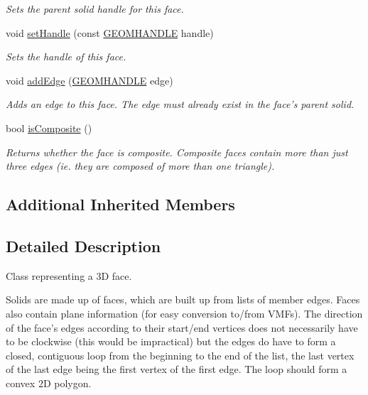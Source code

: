\begin{DoxyCompactItemize}
\begin{DoxyCompactList}\small\item\em Sets the parent solid handle for this face. \end{DoxyCompactList}\item 
void \hyperlink{class_face3_d_a3f040832e7d61cddc9286acce1597bfd}{set\-Handle} (const \hyperlink{vertex_8h_a72202e57358ed73cd212e9a2eaf39aeb}{G\-E\-O\-M\-H\-A\-N\-D\-L\-E} handle)
\begin{DoxyCompactList}\small\item\em Sets the handle of this face. \end{DoxyCompactList}\item 
void \hyperlink{class_face3_d_a67c54bddb563a26bdde53b59ba38ae86}{add\-Edge} (\hyperlink{vertex_8h_a72202e57358ed73cd212e9a2eaf39aeb}{G\-E\-O\-M\-H\-A\-N\-D\-L\-E} edge)
\begin{DoxyCompactList}\small\item\em Adds an edge to this face. The edge must already exist in the face's parent solid. \end{DoxyCompactList}\item 
bool \hyperlink{class_face3_d_a5f360979f999dfaa2f7be7ed3c66ef0f}{is\-Composite} ()
\begin{DoxyCompactList}\small\item\em Returns whether the face is composite. Composite faces contain more than just three edges (ie. they are composed of more than one triangle). \end{DoxyCompactList}\end{DoxyCompactItemize}
\subsection*{Additional Inherited Members}


\subsection{Detailed Description}
Class representing a 3\-D face. 

Solids are made up of faces, which are built up from lists of member edges. Faces also contain plane information (for easy conversion to/from V\-M\-Fs). The direction of the face's edges according to their start/end vertices does not necessarily have to be clockwise (this would be impractical) but the edges do have to form a closed, contiguous loop from the beginning to the end of the list, the last vertex of the last edge being the first vertex of the first edge. The loop should form a convex 2\-D polygon. 


